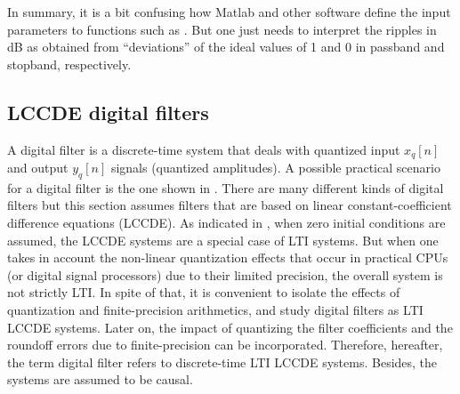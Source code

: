 In summary, it is a bit confusing how Matlab and other software define the input parameters
to functions such as . But one just needs to interpret the ripples in dB as obtained
from ``deviations'' of the ideal values of 1 and 0 in passband and stopband, respectively.



\subsection{LCCDE digital filters}

A digital filter is a discrete-time system that deals with quantized input $x_q[n]$ and output $y_q[n]$ signals (quantized amplitudes). A possible practical scenario for a digital filter is the one shown in . There are many different kinds of digital filters but this section assumes filters that are based on linear constant-coefficient difference equations (LCCDE). As indicated in , when zero initial conditions are assumed, the LCCDE systems are a special case of LTI systems. But when one takes in account the non-linear quantization effects that occur in practical CPUs (or digital signal processors) due to their limited precision, the overall system is not strictly LTI. In spite of that, it is convenient to isolate the effects of quantization and finite-precision arithmetics, and study digital filters as LTI LCCDE systems. Later on, the impact of quantizing the filter coefficients and the roundoff errors due to finite-precision can be incorporated. Therefore, hereafter, the term digital filter refers to discrete-time LTI LCCDE systems. Besides, the systems are assumed to be causal.

